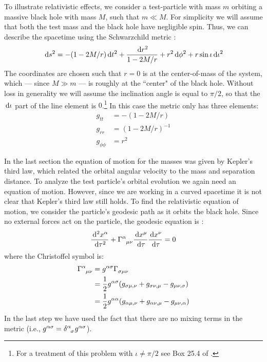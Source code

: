 To illustrate relativistic effects, we consider a test-particle with mass $m$ orbiting a massive black hole with mass $M$, such that $m \ll M$. For simplicity we will assume that both the test mass and the black hole have negligible spin. Thus, we can describe the spacetime using the Schwarzchild metric \cite{ref:MTW}:
\begin{equation}
\,\mathrm{d} s^2 = - (1 - 2M/r)\,\mathrm{d} t^2 + \frac{\,\mathrm{d} r^2}{1 - 2M/r} + r^2\,\mathrm{d}\phi^2 + r\sin\iota \,\mathrm{d}\iota^2
\end{equation}
The coordinates are chosen such that $r=0$ is at the center-of-mass of the system, which --- since $M \gg m$ --- is roughly at the ``center" of the black hole. Without loss in generality we will assume the inclination angle is equal to $\pi/2$, so that the $\,\mathrm{d}\iota$ part of the line element is $0$.\footnote{For a treatment of this problem with $\iota \neq \pi/2$ see Box 25.4 of \cite{ref:MTW}.} In this case the metric only has three elements:
\begin{subequations}
\begin{align}
g_{tt} &= - (1 - 2M/r) \\
g_{rr} &= (1-2M/r)^{-1} \\
g_{\phi\phi} &= r^2
\end{align}
\end{subequations}

In the last section the equation of motion for the masses was given by Kepler's third law, which related the orbital angular velocity to the mass and separation distance. To analyze the test particle's orbital evolution we again need an equation of motion. However, since we are working in a curved spacetime it is not clear that Kepler's third law still holds. To find the relativistic equation of motion, we consider the particle's geodesic path as it orbits the black hole. Since no external forces act on the particle, the geodesic equation is \cite{ref:MTW, ref:Schutz, ref:Carroll}:
\begin{equation}
\frac{\d^2 x^{\alpha}}{\d \tau^2} + \Gamma\indices{^\alpha_{\mu \nu}} \frac{\d x^{\mu}}{\d\tau} \frac{\d x^{\nu}}{\d\tau} = 0
\end{equation}
where the Christoffel symbol is:
\begin{align}
\label{eqn:christoffel_symbols}
\Gamma\indices{^\alpha_{\mu\nu}} &= g^{\alpha\sigma}\Gamma\indices{_{\sigma\mu\nu}} \nonumber \\
    &= \frac{1}{2}g^{\alpha\sigma}( g_{\sigma\mu,\nu} + g_{\sigma\nu,\mu} - g_{\mu\nu,\sigma}) \nonumber \\
    &= \frac{1}{2}g^{\alpha\alpha}(g_{\alpha\mu,\nu} + g_{\alpha\nu,\mu} - g_{\mu\nu,\alpha})
\end{align}
In the last step we have used the fact that there are no mixing terms in the metric (i.e., $g^{\alpha\sigma} = \delta\indices{^{\alpha}_\sigma}g^{\alpha\sigma}$). 


